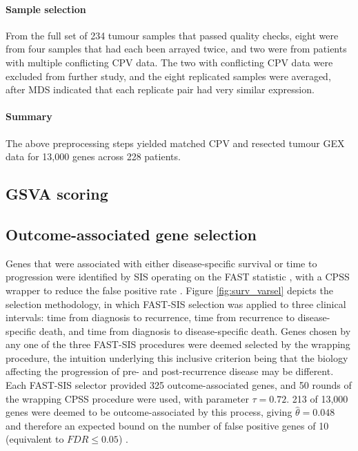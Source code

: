 \documentclass[thesis.tex]{subfiles}
\begin{document}
\paragraph{Sample selection}  From the full set of 234 tumour samples that passed quality checks, eight were from four samples that had each been arrayed twice, and two were from patients with multiple conflicting \gls{CPV} data.  The two with conflicting \gls{CPV} data were excluded from further study, and the eight replicated samples were averaged, after \gls{MDS} indicated that each replicate pair had very similar expression.

\paragraph{Summary}
The above preprocessing steps yielded matched \gls{CPV} and resected tumour \gls{GEX} data for 13,000 genes across 228 patients.

\subsection{GSVA scoring}


\subsection{Outcome-associated gene selection}

Genes that were associated with either disease-specific survival or time to progression were identified by \gls{SIS} operating on the \gls{FAST} statistic \cite{Gorst-Rasmussen2013}, with a \gls{CPSS} wrapper to reduce the false positive rate \cite{Shah2013}.  Figure \ref{fig:surv_varsel} depicts the selection methodology, in which \gls{FAST}-\gls{SIS} selection was applied to three clinical intervals: time from diagnosis to recurrence, time from recurrence to disease-specific death, and time from diagnosis to disease-specific death.  Genes chosen by any one of the three \gls{FAST}-\gls{SIS} procedures were deemed selected by the wrapping procedure, the intuition underlying this inclusive criterion being that the biology affecting the progression of pre- and post-recurrence disease may be different.  Each \gls{FAST}-\gls{SIS} selector provided 325 outcome-associated genes, and 50 rounds of the wrapping \gls{CPSS} procedure were used, with parameter $\tau = 0.72$.  213 of 13,000 genes were deemed to be outcome-associated by this process, giving $\hat{\theta} = 0.048$ and therefore an expected bound on the number of false positive genes of 10 (equivalent to $FDR \leq 0.05$) \cite{Shah2013}. 
\end{document}
